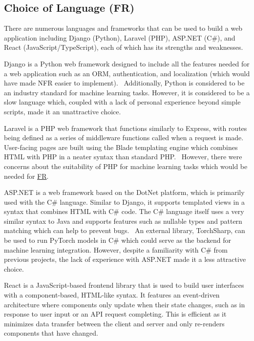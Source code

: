 \subsection{Choice of Language (FR)}\label{sec:language}

There are numerous languages and frameworks that can be used to build a web application including
Django (Python), Laravel (PHP), ASP.NET (C\#), and React (JavaScript/TypeScript), each of which has
its strengths and weaknesses.

Django is a Python web framework designed to include all the features needed for a web application such
as an ORM, authentication, and localization (which would have made NFR
easier to implement).~\cite{ghimire_comparative_2020} Additionally, Python is considered to be an
industry standard for machine learning tasks. However, it is considered to be a slow language\cite{srinath_pythonfastest_2017}
which, coupled with a lack of personal experience beyond simple scripts, made it an unattractive choice.

Laravel is a PHP web framework that functions similarly to Express, with routes being defined as a series of
middleware functions called when a request is made. User-facing pages are built using the Blade templating engine
which combines HTML with PHP in a neater syntax than standard PHP.~\cite{nguyen_building_2015,he_design_2015}
However, there were concerns about the suitability of PHP for machine learning tasks which would be needed for
\hyperref[req:similar_recipes]{FR}.

ASP.NET is a web framework based on the DotNet platform, which is primarily used with the C\# language.
Similar to Django, it supports templated views in a syntax that combines HTML with C\# code. The C\# language
itself uses a very similar syntax to Java and supports features such as nullable types and pattern matching
which can help to prevent bugs.~\cite{gao_type_2017} An external library, TorchSharp, can be used to run
PyTorch models in C\# which could serve as the backend for machine learning integration. However, despite
a familiarity with C\# from previous projects, the lack of experience with ASP.NET made it a less attractive
choice.

React is a JavaScript-based frontend library that is used to build user interfaces with a component-based,
HTML-like syntax. It features an event-driven architecture where components only update when their state changes,
such as in response to user input or an API request completing. This is efficient as it minimizes data transfer
between the client and server and only re-renders components that have changed.


